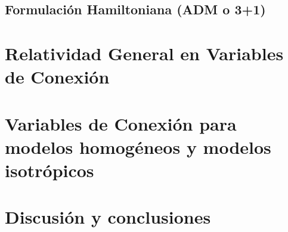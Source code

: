 \documentclass[11pt, letterpaper, spanish]{book}
\theoremstyle{definition}
\theoremstyle{plain}
\theoremstyle{remark}
\theoremstyle{break}
\begin{document}

\section{Formulaci\'{o}n Hamiltoniana (ADM o 3+1)}









\chapter{Relatividad General en Variables de Conexi\'{o}n}






\chapter{Variables de Conexi\'{o}n para modelos homog\'{e}neos y modelos isotr\'{o}picos}
\label{chp:SymmetryReduction}





\chapter{Discusi\'{o}n y conclusiones}



\end{document}
